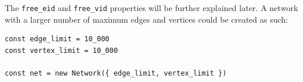 The \texttt{free_eid} and \texttt{free_vid} properties will be further explained later.
A network with a larger number of maximum edges and vertices could be created as such:

\begin{verbatim}
const edge_limit = 10_000
const vertex_limit = 10_000

const net = new Network({ edge_limit, vertex_limit })
\end{verbatim}